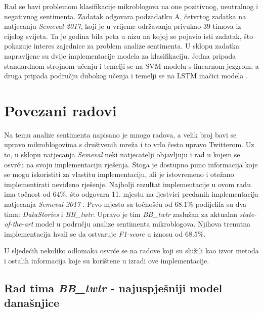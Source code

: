 \documentclass[times, utf8, zavrsni]{fer}
\begin{document}
Rad se bavi problemom klasifikacije mikroblogova na one pozitivnog, neutralnog i negativnog sentimenta. Zadatak odgovara podzadatku A, četvrtog zadatka na natjecanju \emph{Semeval 2017}, koji je u vrijeme održavanja privukao $39$ timova iz cijelog svijeta. Ta je godina bila peta u nizu na kojoj se pojavio isti zadatak, što pokazuje interes zajednice za problem analize sentimenta. U sklopu zadatka napravljene su dvije implementacije modela za klasifikaciju. Jedna pripada standardnom strojnom učenju i temelji se na \gls{SVM}-modelu s linearnom jezgrom, a druga pripada području dubokog učenja i temelji se na \Gls{LSTM} inačici modela .

\chapter{Povezani radovi}


Na temu analize sentimenta napisano je mnogo radova, a velik broj bavi se upravo mikroblogovima s društvenih mreža i to vrlo često upravo Twitterom. Uz to, u sklopu natjecanja \emph{Semeval} neki natjecatelji objavljuju i rad u kojem se osvrću na svoju implementaciju rješenja. Stoga je dostupno puno informacija koje se mogu iskoristiti za vlastitu implementaciju, ali je istovremeno i otežano implementirati neviđeno rješenje. 
Najbolji rezultat implementacije u ovom radu ima točnost od $64\%$, što odgovara 11. mjestu na ljestvici predanih implementacija natjecanja \emph{Semeval 2017} \citep{semeval2017task4}. Prvo mjesto sa točnošću od $68.1\%$ podijelila su dva tima: \textit{DataStories} i \textit{BB\_twtr}. Upravo je tim \textit{BB\_twtr} zaslužan za aktualan \textit{state-of-the-art} model u području analize sentimenta mikroblogova. Njihova trenutna implementacija hvali se da ostvaruje \textit{F1-score} u iznosu od $68.5\%$.

U sljedećih nekoliko odlomaka osvrće se na radove koji su služili kao izvor metoda i ostalih informacija koje su korištene u izradi ove implementacije.

\section{Rad tima \emph{BB\_twtr} - najuspješniji model današnjice}
\end{document}
